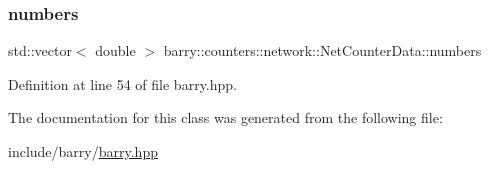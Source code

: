\mbox{\label{classbarry_1_1counters_1_1network_1_1_net_counter_data_a720381c090feafdf9652f0ca19c5cc4b}} 
\subsubsection{\texorpdfstring{numbers}{numbers}}
{\footnotesize\ttfamily std\+::vector$<$ double $>$ barry\+::counters\+::network\+::\+Net\+Counter\+Data\+::numbers}



Definition at line 54 of file barry.\+hpp.



The documentation for this class was generated from the following file\+:\begin{DoxyCompactItemize}
\item 
include/barry/\hyperlink{barry_8hpp}{barry.\+hpp}\end{DoxyCompactItemize}
